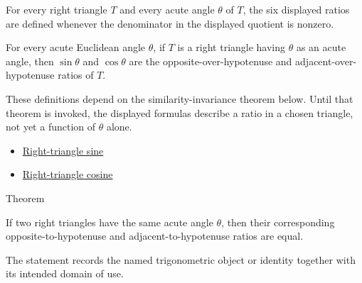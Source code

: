 \begin{remark*}
For every right triangle $T$ and every acute angle $\theta$ of $T$, the six
displayed ratios are defined whenever the denominator in the displayed quotient
is nonzero.
\end{remark*}

\begin{remark*}
For every acute Euclidean angle $\theta$, if $T$ is a right triangle having
$\theta$ as an acute angle, then $\sin\theta$ and $\cos\theta$ are the
opposite-over-hypotenuse and adjacent-over-hypotenuse ratios of $T$.
\end{remark*}
\begin{remark*}
These definitions depend on the similarity-invariance theorem below. Until that
theorem is invoked, the displayed formulas describe a ratio in a chosen
triangle, not yet a function of $\theta$ alone.
\end{remark*}
\begin{dependencies}
\begin{itemize}
  \item \hyperref[def:right-triangle-sine]{Right-triangle sine}
  \item \hyperref[def:right-triangle-cosine]{Right-triangle cosine}
\end{itemize}
\end{dependencies}



\begin{theorembox}{Theorem}
\begin{theorem}
\label{thm:trig-ratios-similarity-invariant}
If two right triangles have the same acute angle $\theta$, then their
corresponding opposite-to-hypotenuse and adjacent-to-hypotenuse ratios are
equal.
\end{theorem}
\end{theorembox}
\begin{remark*}[Interpretation]
The statement records the named trigonometric object or identity together with
its intended domain of use.
\end{remark*}

